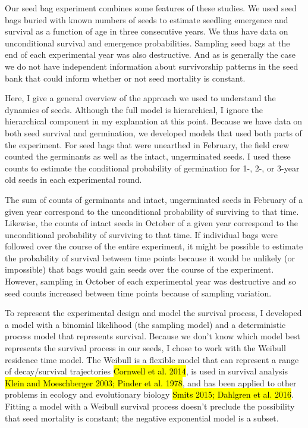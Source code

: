 \documentclass[12pt, oneside, titlepage]{article}   	%
\begin{document}
Our seed bag experiment combines some features of these studies. We used seed bags buried with known numbers of seeds to estimate seedling emergence and survival as a function of age in three consecutive years. We thus have data on unconditional survival and emergence probabilities. Sampling seed bags at the end of each experimental year was also destructive. And as is generally the case we do not have independent information about survivorship patterns in the seed bank that could inform whether or not seed mortality is constant.    

Here, I give a general overview of the approach we used to understand the dynamics of seeds. Although the full model is hierarchical, I ignore the hierarchical component in my explanation at this point. Because we have data on both seed survival and germination, we developed models that used both parts of the experiment. For seed bags that were unearthed in February, the field crew counted the germinants as well as the intact, ungerminated seeds. I used these counts to estimate the conditional probability of germination for 1-, 2-, or 3-year old seeds in each experimental round. 

The sum of counts of germinants and intact, ungerminated seeds in February of a given year correspond to the unconditional probability of surviving to that time. Likewise, the counts of intact seeds in October of a given year correspond to the unconditional probability of surviving to that time. If individual bags were followed over the course of the entire experiment, it might be possible to estimate the probability of survival between time points because it would be unlikely (or impossible) that bags would gain seeds over the course of the experiment. However, sampling in October of each experimental year was destructive and so seed counts increased between time points because of sampling variation. 

To represent the experimental design and model the survival process, I developed a model with a binomial likelihood (the sampling model) and a deterministic process model that represents survival. Because we don't know which model best represents the survival process in our seeds, I chose to work with the Weibull residence time model. The Weibull is a flexible model that can represent a range of decay/survival trajectories \hl{Cornwell et al. 2014}, is used in survival analysis \hl{Klein and Moeschberger 2003; Pinder et al. 1978}, and has been applied to other problems in ecology and evolutionary biology \hl{Smits 2015; Dahlgren et al. 2016}. Fitting a model with a Weibull survival process doesn't preclude the possibility that seed mortality is constant; the negative exponential model is a subset. 
\end{document}

